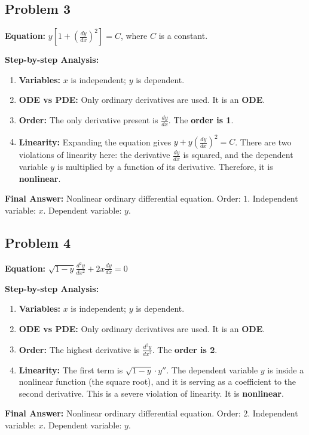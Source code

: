 \documentclass[11pt]{article}
\begin{document}
\subsection*{Problem 3}
\textbf{Equation:} $y\left[1 + \left(\frac{dy}{dx}\right)^2\right] = C$, where $C$ is a constant.
\vspace{0.2cm}

\noindent\textbf{Step-by-step Analysis:}
\begin{enumerate}
    \item \textbf{Variables:} $x$ is independent; $y$ is dependent.
    \item \textbf{ODE vs PDE:} Only ordinary derivatives are used. It is an \textbf{ODE}.
    \item \textbf{Order:} The only derivative present is $\frac{dy}{dx}$. The \textbf{order is 1}.
    \item \textbf{Linearity:} Expanding the equation gives $y + y\left(\frac{dy}{dx}\right)^2 = C$. There are two violations of linearity here: the derivative $\frac{dy}{dx}$ is squared, and the dependent variable $y$ is multiplied by a function of its derivative. Therefore, it is \textbf{nonlinear}.
\end{enumerate}
\textbf{Final Answer:} Nonlinear ordinary differential equation. Order: $1$. Independent variable: $x$. Dependent variable: $y$.

\subsection*{Problem 4}
\textbf{Equation:} $\sqrt{1-y} \frac{d^2y}{dx^2} + 2x \frac{dy}{dx} = 0$
\vspace{0.2cm}

\noindent\textbf{Step-by-step Analysis:}
\begin{enumerate}
    \item \textbf{Variables:} $x$ is independent; $y$ is dependent.
    \item \textbf{ODE vs PDE:} Only ordinary derivatives are used. It is an \textbf{ODE}.
    \item \textbf{Order:} The highest derivative is $\frac{d^2y}{dx^2}$. The \textbf{order is 2}.
    \item \textbf{Linearity:} The first term is $\sqrt{1-y} \cdot y''$. The dependent variable $y$ is inside a nonlinear function (the square root), and it is serving as a coefficient to the second derivative. This is a severe violation of linearity. It is \textbf{nonlinear}.
\end{enumerate}
\textbf{Final Answer:} Nonlinear ordinary differential equation. Order: $2$. Independent variable: $x$. Dependent variable: $y$.
\end{document}

